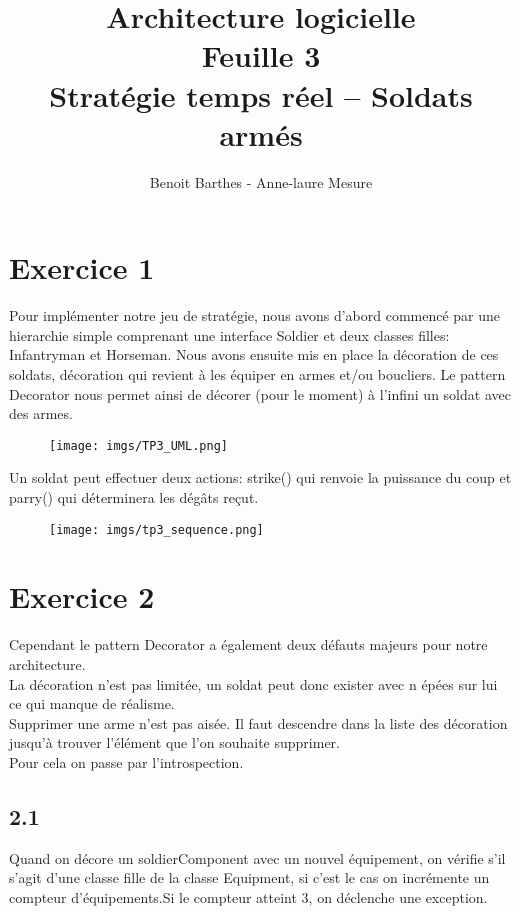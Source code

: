 \documentclass[%
a4paper,
11pt
]{article}
\begin{document}
\title{Architecture logicielle \\ Feuille 3 \\ Stratégie temps réel – Soldats armés}
\author{Benoit Barthes - Anne-laure Mesure}
\maketitle

\section*{Exercice 1}

Pour implémenter notre jeu de stratégie, nous avons d'abord commencé par une hierarchie simple comprenant une interface Soldier et deux classes filles: Infantryman et Horseman. Nous avons ensuite mis en place la décoration de ces soldats, décoration qui revient à les équiper en armes et/ou boucliers. Le pattern Decorator nous permet ainsi de décorer (pour le moment) à l'infini un soldat avec des armes.
\begin{figure}[!ht]
    \center
    \texttt{[image: imgs/TP3\_UML.png]}
\end{figure}

Un soldat peut effectuer deux actions: strike() qui renvoie la puissance du coup et parry() qui déterminera les dégâts reçut.

\begin{figure}[!ht]
    \center
    \texttt{[image: imgs/tp3\_sequence.png]}
\end{figure}

\section*{Exercice 2}
Cependant le pattern Decorator a également deux défauts majeurs pour notre architecture.\\
La décoration n'est pas limitée, un soldat peut donc exister avec n épées sur lui ce qui manque de réalisme.\\
Supprimer une arme n'est pas aisée. Il faut descendre dans la liste des décoration  jusqu'à trouver l'élément que l'on souhaite supprimer.\\
Pour cela on passe par l'introspection.

\subsection*{2.1}
Quand on décore un soldierComponent avec un nouvel équipement, on vérifie s'il s'agit d'une classe fille de la classe Equipment, si c'est le cas on incrémente un compteur d'équipements.Si le compteur atteint 3, on déclenche une exception.
\end{document}
